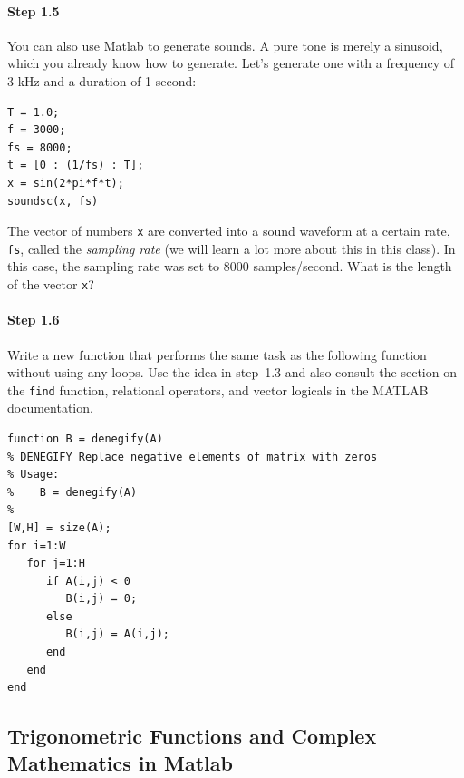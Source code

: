 \paragraph{Step 1.5} You can also use Matlab to generate sounds. A
pure tone is merely a sinusoid, which you already know how to
generate. Let's generate one with a frequency of 3 kHz and a duration
of 1 second:
\begin{lstlisting}[style=Matlab-editor,basicstyle=\mlttfamily\small]
T = 1.0;
f = 3000;
fs = 8000;
t = [0 : (1/fs) : T];
x = sin(2*pi*f*t);
soundsc(x, fs)
\end{lstlisting}

The vector of numbers \texttt{x} are converted into a sound waveform
at a certain rate, \verb|fs|, called the \emph{sampling rate} (we will
learn a lot more about this in this class). In this case, the sampling
rate was set to 8000 samples/second. What is the length of
the vector \texttt{x}?

\paragraph{Step 1.6} Write a new function that performs the same task
as the following function without using any loops. Use the idea in
step~1.3 and also consult the section on the \verb|find| function,
relational operators, and vector logicals in the MATLAB documentation.
\begin{lstlisting}[style=Matlab-editor,basicstyle=\mlttfamily\small]
function B = denegify(A)
% DENEGIFY Replace negative elements of matrix with zeros
% Usage:
%    B = denegify(A)
%
[W,H] = size(A);
for i=1:W
   for j=1:H
      if A(i,j) < 0
         B(i,j) = 0;
      else
         B(i,j) = A(i,j);
      end
   end
end
\end{lstlisting}



\subsection{Trigonometric Functions and Complex Mathematics in Matlab}



